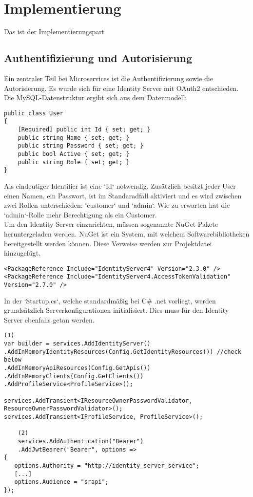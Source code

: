 \section{Implementierung}
Das ist der Implementierungspart

\subsection{Authentifizierung und Autorisierung}
Ein zentraler Teil bei Microservices ist die Authentifizierung sowie die Autorisierung. Es wurde sich für eine Identity Server mit OAuth2 entschieden. Die MySQL-Datenstruktur ergibt sich aus dem Datenmodell:

\begin{verbatim}
public class User
{
    [Required] public int Id { set; get; }
    public string Name { set; get; }
    public string Password { set; get; }
    public bool Active { set; get; }
    public string Role { set; get; }
}
\end{verbatim}

Als eindeutiger Identifier ist eine `Id` notwendig. Zusätzlich besitzt jeder User einen Namen, ein Passwort, ist im Standaradfall aktiviert und es wird zwischen zwei Rollen unterschieden: `customer` und  `admin`. Wie zu erwarten hat die `admin`-Rolle mehr Berechtigung als ein Customer. \\

Um den Identity Server einzurichten, müssen sogenannte NuGet-Pakete heruntergeladen werden. NuGet ist ein System, mit welchem Softwarebibliotheken bereitgestellt werden können. Diese Verweise werden zur Projektdatei hinzugefügt.

\begin{verbatim}
<PackageReference Include="IdentityServer4" Version="2.3.0" />
<PackageReference Include="IdentityServer4.AccessTokenValidation" Version="2.7.0" />
\end{verbatim}

In der `Startup.cs`, welche standardmäßig bei C\# .net vorliegt, werden grundsätzlich Serverkonfigurationen initialisiert. Dies muss für den Identity Server ebenfalls getan werden.

\begin{verbatim}
(1)
var builder = services.AddIdentityServer()
.AddInMemoryIdentityResources(Config.GetIdentityResources()) //check below
.AddInMemoryApiResources(Config.GetApis())
.AddInMemoryClients(Config.GetClients())
.AddProfileService<ProfileService>();

services.AddTransient<IResourceOwnerPasswordValidator, ResourceOwnerPasswordValidator>();
services.AddTransient<IProfileService, ProfileService>();
	
	(2)
	services.AddAuthentication("Bearer")
	.AddJwtBearer("Bearer", options =>
{
   options.Authority = "http://identity_server_service";
   [...]
   options.Audience = "srapi";
});
\end{verbatim}  

